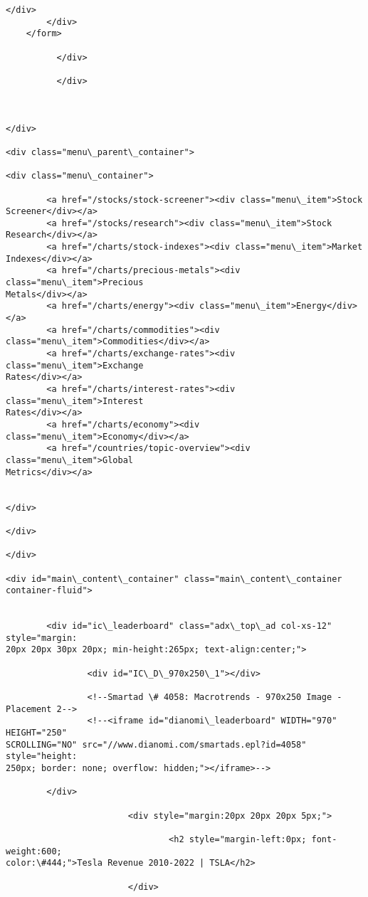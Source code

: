 \documentclass[11pt]{article}
\begin{document}
\begin{Verbatim}[commandchars=\\\{\}]
            </div>
        </div>
    </form>

          </div>

          </div>



</div>

<div class="menu\_parent\_container">

<div class="menu\_container">

        <a href="/stocks/stock-screener"><div class="menu\_item">Stock
Screener</div></a>
        <a href="/stocks/research"><div class="menu\_item">Stock
Research</div></a>
        <a href="/charts/stock-indexes"><div class="menu\_item">Market
Indexes</div></a>
        <a href="/charts/precious-metals"><div class="menu\_item">Precious
Metals</div></a>
        <a href="/charts/energy"><div class="menu\_item">Energy</div></a>
        <a href="/charts/commodities"><div
class="menu\_item">Commodities</div></a>
        <a href="/charts/exchange-rates"><div class="menu\_item">Exchange
Rates</div></a>
        <a href="/charts/interest-rates"><div class="menu\_item">Interest
Rates</div></a>
        <a href="/charts/economy"><div class="menu\_item">Economy</div></a>
        <a href="/countries/topic-overview"><div class="menu\_item">Global
Metrics</div></a>


</div>

</div>

</div>

<div id="main\_content\_container" class="main\_content\_container container-fluid">


        <div id="ic\_leaderboard" class="adx\_top\_ad col-xs-12" style="margin:
20px 20px 30px 20px; min-height:265px; text-align:center;">

                <div id="IC\_D\_970x250\_1"></div>

                <!--Smartad \# 4058: Macrotrends - 970x250 Image - Placement 2-->
                <!--<iframe id="dianomi\_leaderboard" WIDTH="970" HEIGHT="250"
SCROLLING="NO" src="//www.dianomi.com/smartads.epl?id=4058"  style="height:
250px; border: none; overflow: hidden;"></iframe>-->

        </div>

                        <div style="margin:20px 20px 20px 5px;">

                                <h2 style="margin-left:0px; font-weight:600;
color:\#444;">Tesla Revenue 2010-2022 | TSLA</h2>

                        </div>



\end{Verbatim}
\end{document}
